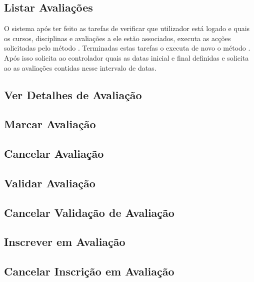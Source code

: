 \subsection{Listar Avaliações}
O sistema após ter feito as tarefas de verificar que utilizador está logado e quais os cursos, disciplinas e avaliações a ele estão associados, executa as acções solicitadas pelo método . Terminadas estas tarefas o  executa de novo o método .\\
Após isso solicita ao controlador  quais as datas inicial e final definidas e solicita ao  as avaliações contidas nesse intervalo de datas.

\subsection{Ver Detalhes de Avaliação}
\subsection{Marcar Avaliação}
\subsection{Cancelar Avaliação}
\subsection{Validar Avaliação}
\subsection{Cancelar Validação de Avaliação}
\subsection{Inscrever em Avaliação}
\subsection{Cancelar Inscrição em Avaliação}